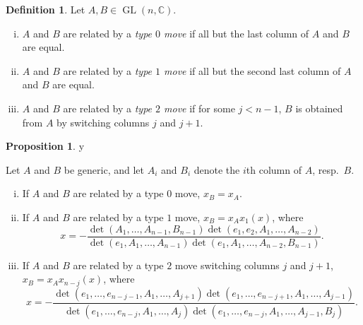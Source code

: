 \documentclass[11pt]{amsart}
\theoremstyle{definition}
\newtheorem{proposition}[theorem]{Proposition}
\newtheorem{definition}[theorem]{Definition}
\numberwithin{equation}{section}
\def\printname#1{
        \if\draft y
                \smash{\makebox[0pt]{\hspace{-0.5in}
                        \raisebox{8pt}{\tt\tiny #1}}}
        \fi
}
\def\lbl#1{\label{#1}\printname{#1}}
\DeclareMathOperator{\GL}{GL}
\DeclarePairedDelimiter{\Norm}{\lvert}{\rvert}
\newcommand{\C}{\mathbb C}
\begin{document}
\begin{definition} 
Let $A,B\in\GL(n,\C)$. 
\begin{enumerate}[(i)]
\item $A$ and $B$ are related by a \emph{type $0$ move} if all but the last column of $A$ and $B$ are equal.
\item $A$ and $B$ are related by a \emph{type $1$ move} if all but the second last column of $A$ and $B$ are equal.
\item $A$ and $B$ are related by a \emph{type $2$ move} if for some $j<n-1$, $B$ is obtained from $A$ by switching columns $j$ and $j+1$. 
\end{enumerate}
\end{definition}


\begin{proposition}
\lbl{moveeffectonx} 
Let $A$ and $B$ be generic, and let $A_i$ and $B_i$ denote the $i$th column of $A$, resp.~$B$.
\begin{enumerate}[(i)]
\item If $A$ and $B$ are related by a type $0$ move, $x_B=x_A$.
\item If $A$ and $B$ are related by a type $1$ move, $x_B=x_Ax_1(x)$, where
\begin{equation}
x=-\frac{\det(A_1,\dots,A_{n-1},B_{n-1})\det(e_1,e_2,A_1,\dots,A_{n-2})}{\det(e_1,A_1,\dots,A_{n-1})\det(e_1,A_1,\dots,A_{n-2},B_{n-1})}.
\end{equation}
\item If $A$ and $B$ are related by a type $2$ move switching columns $j$ and $j+1$, $x_B=x_Ax_{n-j}(x)$, where
\begin{equation}
x=-\frac{\det(e_1,\dots,e_{n-j-1},A_1,\dots,A_{j+1})\det(e_1,\dots,e_{n-j+1},A_1,\dots,A_{j-1})}{\det(e_1,\dots,e_{n-j},A_1,\dots,A_j)\det(e_1,\dots,e_{n-j},A_1,\dots,A_{j-1},B_j)}.
\end{equation}
\end{enumerate}
\end{proposition}
\end{document}
